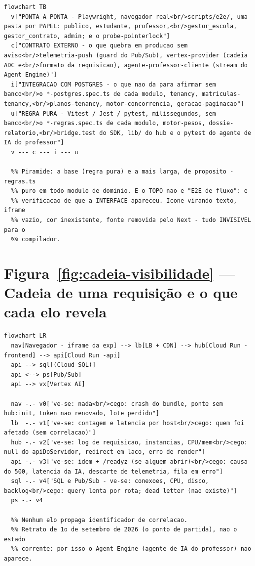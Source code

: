 \begin{lstlisting}[language=mermaid]
flowchart TB
  v["PONTA A PONTA - Playwright, navegador real<br/>scripts/e2e/, uma pasta por PAPEL: publico, estudante, professor,<br/>gestor_escola, gestor_contrato, admin; e o probe-pointerlock"]
  c["CONTRATO EXTERNO - o que quebra em producao sem aviso<br/>telemetria-push (guard do Pub/Sub), vertex-provider (cadeia ADC e<br/>formato da requisicao), agente-professor-cliente (stream do Agent Engine)"]
  i["INTEGRACAO COM POSTGRES - o que nao da para afirmar sem banco<br/>o *-postgres.spec.ts de cada modulo, tenancy, matriculas-tenancy,<br/>planos-tenancy, motor-concorrencia, geracao-paginacao"]
  u["REGRA PURA - Vitest / Jest / pytest, milissegundos, sem banco<br/>o *-regras.spec.ts de cada modulo, motor-pesos, dossie-relatorio,<br/>bridge.test do SDK, lib/ do hub e o pytest do agente de IA do professor"]
  v --- c --- i --- u

  %% Piramide: a base (regra pura) e a mais larga, de proposito - regras.ts
  %% puro em todo modulo de dominio. E o TOPO nao e "E2E de fluxo": e
  %% verificacao de que a INTERFACE apareceu. Icone virando texto, iframe
  %% vazio, cor inexistente, fonte removida pelo Next - tudo INVISIVEL para o
  %% compilador.
\end{lstlisting}

\section{Figura~\ref{fig:cadeia-visibilidade} --- Cadeia de uma requisição e o que cada elo revela}

\begin{lstlisting}[language=mermaid]
flowchart LR
  nav[Navegador - iframe da exp] --> lb[LB + CDN] --> hub[Cloud Run -frontend] --> api[Cloud Run -api]
  api --> sql[(Cloud SQL)]
  api <--> ps[Pub/Sub]
  api --> vx[Vertex AI]

  nav -.- v0["ve-se: nada<br/>cego: crash do bundle, ponte sem hub:init, token nao renovado, lote perdido"]
  lb  -.- v1["ve-se: contagem e latencia por host<br/>cego: quem foi afetado (sem correlacao)"]
  hub -.- v2["ve-se: log de requisicao, instancias, CPU/mem<br/>cego: null do apiDoServidor, redirect em laco, erro de render"]
  api -.- v3["ve-se: idem + /readyz (se alguem abrir)<br/>cego: causa do 500, latencia da IA, descarte de telemetria, fila em erro"]
  sql -.- v4["SQL e Pub/Sub - ve-se: conexoes, CPU, disco, backlog<br/>cego: query lenta por rota; dead letter (nao existe)"]
  ps -.- v4

  %% Nenhum elo propaga identificador de correlacao.
  %% Retrato de 1o de setembro de 2026 (o ponto de partida), nao o estado
  %% corrente: por isso o Agent Engine (agente de IA do professor) nao aparece.
\end{lstlisting}

